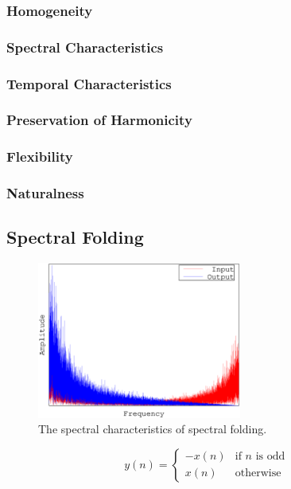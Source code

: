 		\subsubsection*{Homogeneity}
		\subsubsection*{Spectral Characteristics}
		\subsubsection*{Temporal Characteristics}
		\subsubsection*{Preservation of Harmonicity}
		\subsubsection*{Flexibility}
		\subsubsection*{Naturalness}

	\subsection{Spectral Folding}
	\label{sec:Excitation-SpectralFolding}
	
		\begin{figure}[h!]
			\centering
			\includegraphics[width=0.6\textwidth]{chapter3/Images/SpectralFolding.eps}
			\caption{The spectral characteristics of spectral folding.}
			\label{fig:SpectralFolding}
		\end{figure}

		\begin{equation}
			y(n) = \begin{cases}
				-x(n) & \text{if $n$ is odd} \\
				x(n) & \text{otherwise}
			\end{cases}
			\label{eq:SpectralFolding}
		\end{equation}

